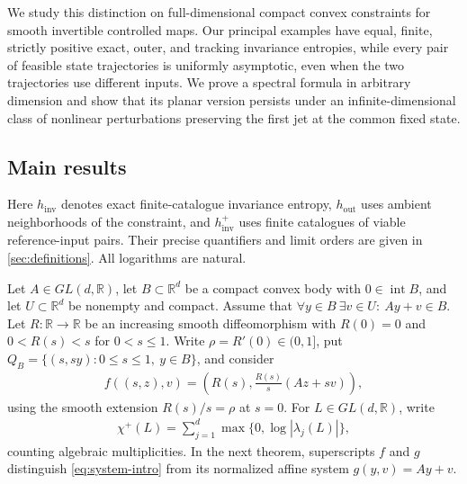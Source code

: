 \documentclass[11pt,a4paper]{article}
\theoremstyle{definition}
\theoremstyle{remark}
\begin{document}
We study this distinction on full-dimensional compact convex constraints for smooth invertible controlled maps. Our principal examples have equal, finite, strictly positive exact, outer, and tracking invariance entropies, while every pair of feasible state trajectories is uniformly asymptotic, even when the two trajectories use different inputs. We prove a spectral formula in arbitrary dimension and show that its planar version persists under an infinite-dimensional class of nonlinear perturbations preserving the first jet at the common fixed state.

\subsection{Main results}

Here \(h_{\mathrm{inv}}\) denotes exact finite-catalogue invariance entropy, \(h_{\mathrm{out}}\) uses ambient neighborhoods of the constraint, and \(h_{\mathrm{inv}}^+\) uses finite catalogues of viable reference-input pairs. Their precise quantifiers and limit orders are given in \cref{sec:definitions}. All logarithms are natural.

Let \(A\in GL(d,\mathbb R)\), let \(B\subset\mathbb R^d\) be a compact convex body with \(0\in\operatorname{int}B\), and let \(U\subset\mathbb R^d\) be nonempty and compact. Assume that
\(\forall y\in B\ \exists v\in U:\ Ay+v\in B\).
Let \(R:\mathbb R\to\mathbb R\) be an increasing smooth diffeomorphism with \(R(0)=0\) and \(0<R(s)<s\) for \(0<s\leq1\). Write \(\rho=R'(0)\in(0,1]\), put
\(Q_B=\{(s,sy):0\leq s\leq1,\ y\in B\}\), and consider
\begin{align}\label{eq:system-intro}
 f((s,z),v)=\left(R(s),\frac{R(s)}s(Az+sv)\right),
\end{align}
using the smooth extension \(R(s)/s=\rho\) at \(s=0\). For \(L\in GL(d,\mathbb R)\), write
\begin{align}\label{eq:chi}
 \chi^+(L)=\sum_{j=1}^d\max\{0,\log|\lambda_j(L)|\},
\end{align}
counting algebraic multiplicities. In the next theorem, superscripts \(f\) and \(g\) distinguish \eqref{eq:system-intro} from its normalized affine system \(g(y,v)=Ay+v\).
\end{document}
